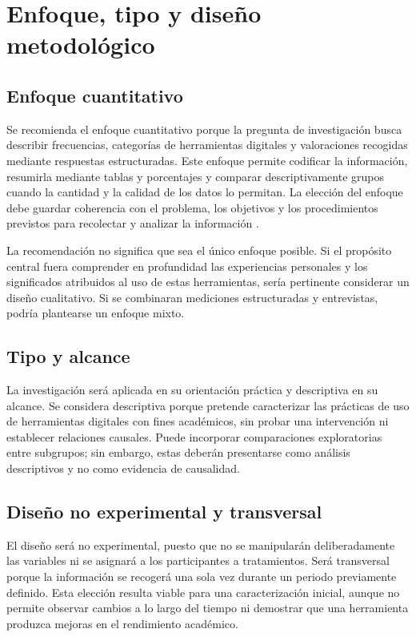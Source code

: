 
\section{Enfoque, tipo y diseño metodológico}

\subsection{Enfoque cuantitativo}

Se recomienda el enfoque cuantitativo porque la pregunta de investigación busca describir frecuencias, categorías de herramientas digitales y valoraciones recogidas mediante respuestas estructuradas. Este enfoque permite codificar la información, resumirla mediante tablas y porcentajes y comparar descriptivamente grupos cuando la cantidad y la calidad de los datos lo permitan. La elección del enfoque debe guardar coherencia con el problema, los objetivos y los procedimientos previstos para recolectar y analizar la información \parencite{feriaavila2019dimension,guerrero2015metodologia}.

La recomendación no significa que sea el único enfoque posible. Si el propósito central fuera comprender en profundidad las experiencias personales y los significados atribuidos al uso de estas herramientas, sería pertinente considerar un diseño cualitativo. Si se combinaran mediciones estructuradas y entrevistas, podría plantearse un enfoque mixto.

\subsection{Tipo y alcance}

La investigación será aplicada en su orientación práctica y descriptiva en su alcance. Se considera descriptiva porque pretende caracterizar las prácticas de uso de herramientas digitales con fines académicos, sin probar una intervención ni establecer relaciones causales. Puede incorporar comparaciones exploratorias entre subgrupos; sin embargo, estas deberán presentarse como análisis descriptivos y no como evidencia de causalidad.

\subsection{Diseño no experimental y transversal}

El diseño será no experimental, puesto que no se manipularán deliberadamente las variables ni se asignará a los participantes a tratamientos. Será transversal porque la información se recogerá una sola vez durante un periodo previamente definido. Esta elección resulta viable para una caracterización inicial, aunque no permite observar cambios a lo largo del tiempo ni demostrar que una herramienta produzca mejoras en el rendimiento académico.

